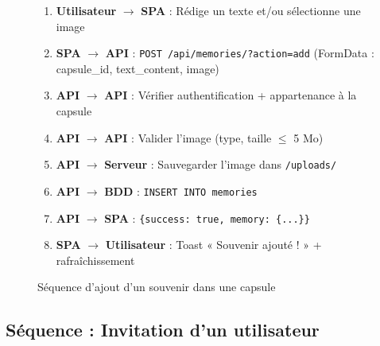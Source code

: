 \documentclass[12pt,a4paper]{report}
\begin{document}
\begin{figure}[H]
    \centering
    \begin{tcolorbox}[colback=codebg, colframe=codeframe, width=\textwidth, title={\textbf{Diagramme de séquence — Ajout d'un souvenir}}]
        \small
        \begin{enumerate}[noitemsep]
            \item \textbf{Utilisateur} $\rightarrow$ \textbf{SPA} : Rédige un texte et/ou sélectionne une image
            \item \textbf{SPA} $\rightarrow$ \textbf{API} : \texttt{POST /api/memories/?action=add} (FormData : capsule\_id, text\_content, image)
            \item \textbf{API} $\rightarrow$ \textbf{API} : Vérifier authentification + appartenance à la capsule
            \item \textbf{API} $\rightarrow$ \textbf{API} : Valider l'image (type, taille $\leq$ 5 Mo)
            \item \textbf{API} $\rightarrow$ \textbf{Serveur} : Sauvegarder l'image dans \texttt{/uploads/}
            \item \textbf{API} $\rightarrow$ \textbf{BDD} : \texttt{INSERT INTO memories}
            \item \textbf{API} $\rightarrow$ \textbf{SPA} : \texttt{\{success: true, memory: \{...\}\}}
            \item \textbf{SPA} $\rightarrow$ \textbf{Utilisateur} : Toast « Souvenir ajouté ! » + rafraîchissement
        \end{enumerate}
    \end{tcolorbox}
    \caption{Séquence d'ajout d'un souvenir dans une capsule}
\end{figure}


\subsection{Séquence : Invitation d'un utilisateur}
\end{document}
